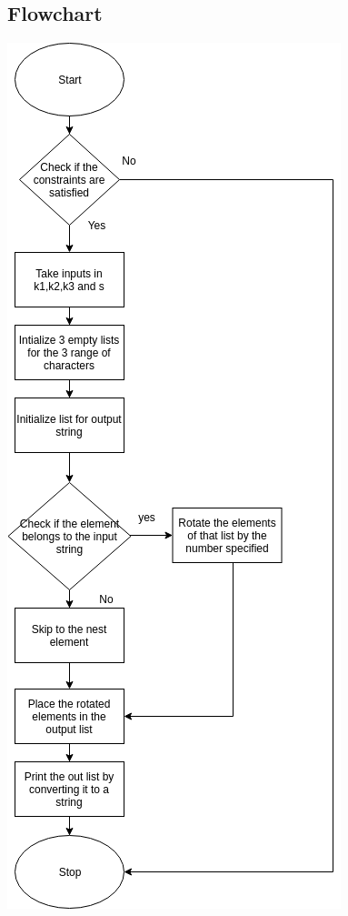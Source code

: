 \documentclass[12pt]{article}
\begin{document}
{{	\subsection{Flowchart}
	\includegraphics[scale=0.5]{f2.png}
	
	
}}
\end{document}
